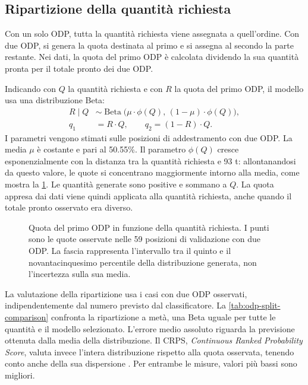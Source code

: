 \subsection{Ripartizione della quantità richiesta}
\label{sec:odp-quantity-allocation}

Con un solo ODP, tutta la quantità richiesta viene assegnata a quell'ordine. Con due ODP, si genera la quota destinata al primo e si assegna al secondo la parte restante. Nei dati, la quota del primo ODP è calcolata dividendo la sua quantità pronta per il totale pronto dei due ODP.

Indicando con $Q$ la quantità richiesta e con $R$ la quota del primo ODP, il modello usa una distribuzione Beta:
\begin{align}
\label{eq:odp-share-distribution}
R\mid Q &\sim \operatorname{Beta}\bigl(\mu\cdot\phi(Q),\,(1-\mu)\cdot\phi(Q)\bigr),\\
\label{eq:odp-quantity-allocation}
q_1 &= R\cdot Q, \qquad q_2=(1-R)\cdot Q.
\end{align}
I parametri vengono stimati sulle posizioni di addestramento con due ODP. La media $\mu$ è costante e pari al \num{50.55}\%. Il parametro $\phi(Q)$ cresce esponenzialmente con la distanza tra la quantità richiesta e 93 t: allontanandosi da questo valore, le quote si concentrano maggiormente intorno alla media, come mostra la \cref{fig:odp-quantity-split}. Le quantità generate sono positive e sommano a $Q$. La quota appresa dai dati viene quindi applicata alla quantità richiesta, anche quando il totale pronto osservato era diverso.

\begin{figure}[htbp]
\centering
{}
\caption{Quota del primo ODP in funzione della quantità richiesta. I punti sono le quote osservate nelle 59 posizioni di validazione con due ODP. La fascia rappresenta l'intervallo tra il quinto e il novantacinquesimo percentile della distribuzione generata, non l'incertezza sulla sua media.}
\label{fig:odp-quantity-split}
\end{figure}

La valutazione della ripartizione usa i casi con due ODP osservati, indipendentemente dal numero previsto dal classificatore. La \cref{tab:odp-split-comparison} confronta la ripartizione a metà, una Beta uguale per tutte le quantità e il modello selezionato. L'errore medio assoluto riguarda la previsione ottenuta dalla media della distribuzione. Il CRPS, \emph{Continuous Ranked Probability Score}, valuta invece l'intera distribuzione rispetto alla quota osservata, tenendo conto anche della sua dispersione \parencite{gneiting2007scoring}. Per entrambe le misure, valori più bassi sono migliori.

